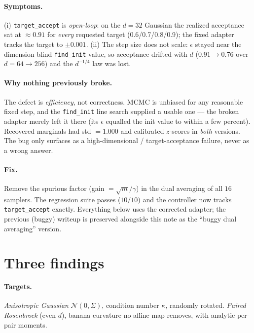 \documentclass[11pt]{article}
\begin{document}
\paragraph{Symptoms.} (i) \texttt{target\_accept} is \emph{open-loop}: on the
$d{=}32$ Gaussian the realized acceptance sat at $\approx0.91$ for
\emph{every} requested target (0.6/0.7/0.8/0.9); the fixed adapter tracks the
target to $\pm0.001$. (ii) The step size does not scale: $\epsilon$ stayed
near the dimension-blind \texttt{find\_init} value, so acceptance drifted with
$d$ ($0.91\!\to\!0.76$ over $d{=}64\!\to\!256$) and the $d^{-1/4}$ law was lost.

\paragraph{Why nothing previously broke.} The defect is \emph{efficiency}, not
correctness. MCMC is unbiased for any reasonable fixed step, and the
\texttt{find\_init} line search supplied a usable one --- the broken adapter
merely left it there (its $\epsilon$ equalled the init value to within a few
percent). Recovered marginals had std $=1.000$ and calibrated $z$-scores in
\emph{both} versions. The bug only surfaces as a high-dimensional /
target-acceptance failure, never as a wrong answer.

\paragraph{Fix.} Remove the spurious factor (gain $=\sqrt m/\gamma$) in the
dual averaging of all $16$ samplers. The regression suite passes ($10/10$) and
the controller now tracks \texttt{target\_accept} exactly. Everything below
uses the corrected adapter; the previous (buggy) writeup is preserved
alongside this note as the ``buggy dual averaging'' version.

\section{Three findings}

\paragraph{Targets.}
\emph{Anisotropic Gaussian} $\mathcal N(0,\Sigma)$, condition number
$\kappa$, randomly rotated. \emph{Paired Rosenbrock} (even $d$), banana
curvature no affine map removes, with analytic per-pair moments.
\end{document}
